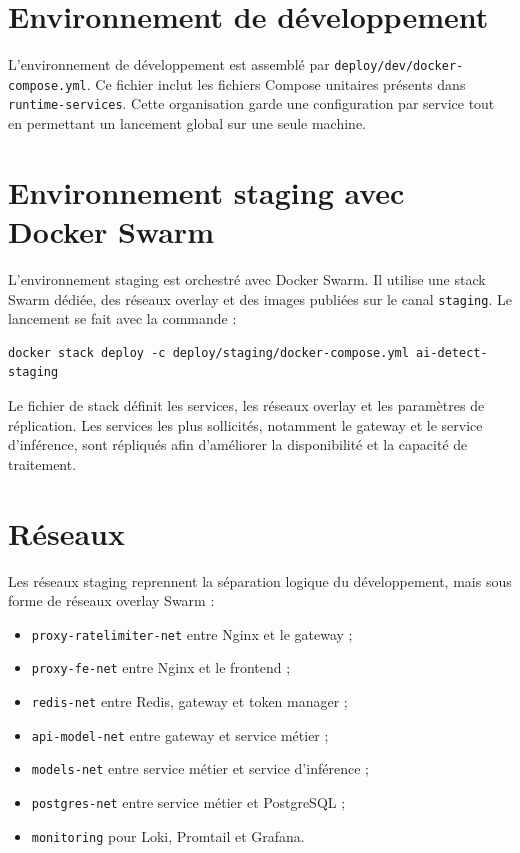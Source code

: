 ﻿\documentclass[12pt, a4paper]{report}
\begin{document}
\section{Environnement de développement}

L'environnement de développement est assemblé par
\texttt{deploy/dev/docker-compose.yml}. Ce fichier inclut les fichiers Compose
unitaires présents dans \texttt{runtime-services}. Cette organisation garde une
configuration par service tout en permettant un lancement global sur une seule
machine.

\section{Environnement staging avec Docker Swarm}

L'environnement staging est orchestré avec Docker Swarm. Il utilise une stack
Swarm dédiée, des réseaux overlay et des images publiées sur le canal
\texttt{staging}. Le lancement se fait avec la commande :

\begin{verbatim}
docker stack deploy -c deploy/staging/docker-compose.yml ai-detect-staging
\end{verbatim}

Le fichier de stack définit les services, les réseaux overlay et les paramètres
de réplication. Les services les plus sollicités, notamment le gateway et le
service d'inférence, sont répliqués afin d'améliorer la disponibilité et la
capacité de traitement.

\section{Réseaux}

Les réseaux staging reprennent la séparation logique du développement, mais sous
forme de réseaux overlay Swarm :

\begin{itemize}
  \item \texttt{proxy-ratelimiter-net} entre Nginx et le gateway ;
  \item \texttt{proxy-fe-net} entre Nginx et le frontend ;
  \item \texttt{redis-net} entre Redis, gateway et token manager ;
  \item \texttt{api-model-net} entre gateway et service métier ;
  \item \texttt{models-net} entre service métier et service d'inférence ;
  \item \texttt{postgres-net} entre service métier et PostgreSQL ;
  \item \texttt{monitoring} pour Loki, Promtail et Grafana.
\end{itemize}
\end{document}

